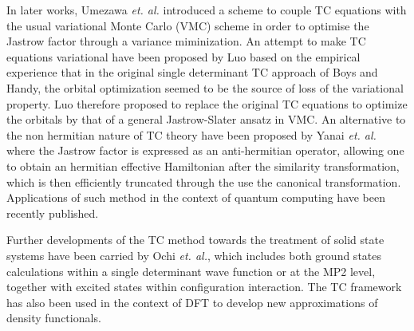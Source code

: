 \documentclass[aip,jcp,reprint,noshowkeys,superscriptaddress,twocolumn]{revtex4-1}
\begin{document}
In later works, Umezawa \textit{et. al.}\cite{UmeTsu-JCP-03,UmeTsuOhnShiChi-JCP-05} introduced a scheme to couple TC equations with the usual variational Monte Carlo (VMC) scheme in order to optimise the Jastrow factor through a variance miminization. 
An attempt to make TC equations variational have been proposed by Luo\cite{Luo-JCP-10,Luo-JCP-11} based on the empirical experience that in the original single determinant TC approach of Boys and Handy, the orbital optimization seemed to be the source of loss of the variational property. Luo therefore proposed to replace the original TC equations to optimize the orbitals by that of a general Jastrow-Slater ansatz in VMC. 
An alternative to the non hermitian nature of TC theory have been proposed by Yanai \textit{et. al.}\cite{YanShi-JCP-12}  where the Jastrow factor is expressed as an anti-hermitian operator, allowing one to obtain an hermitian effective Hamiltonian after the similarity transformation, which is then efficiently truncated through the use the canonical transformation\cite{NeuYanCha-MolPhys-10}. Applications of such method in the context of quantum computing have been recently published\cite{ValTak-PCCP-20}. 

Further developments of the TC method towards the treatment of solid state systems have been carried by Ochi \textit{et. al.}\cite{OchSodSakTsu-JCP-12,OchTsu-JCTC-14,OchTsu-CPL-15,OchYamAriTsu-JCP-16}, which includes both ground states calculations within a single determinant wave function \cite{OchSodSakTsu-JCP-12,OchYamAriTsu-JCP-16} or at the MP2 level\cite{OchTsu-CPL-15}, together with excited states within configuration interaction\cite{OchTsu-JCTC-14}. 
The TC framework has also been used in the context of DFT to develop new approximations of density functionals\cite{ImaScu-JCP-03,UmeChi-PRA-06,Umezawa-JCP-17}. 
\end{document}
